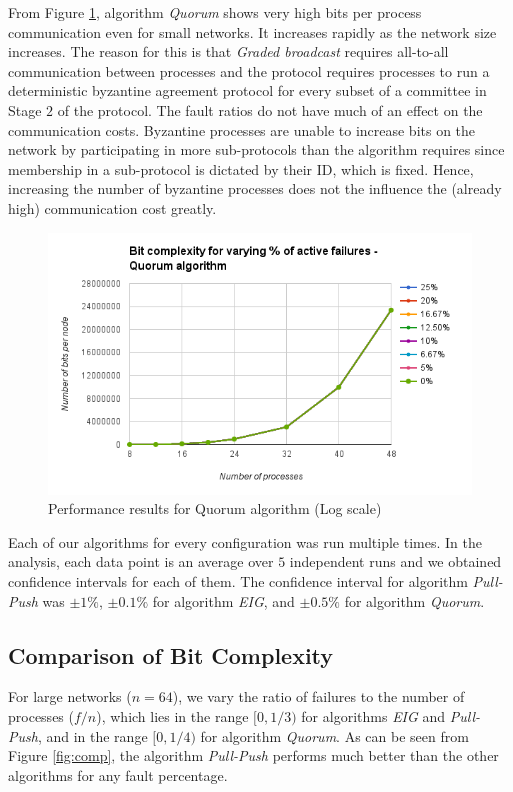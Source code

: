 From Figure \ref{fig:quorum}, algorithm \textit{Quorum} shows very high bits
per process communication even for small networks. It increases rapidly as the
network size increases. The reason for this is that \textit{Graded broadcast}
requires all-to-all communication between processes and the protocol requires
processes to run a deterministic byzantine agreement protocol for every subset
of a committee in Stage $2$ of the protocol. The fault ratios do not have much
of an effect on the communication costs. Byzantine processes are unable to
increase bits on the network by participating in more sub-protocols than the
algorithm requires since membership in a sub-protocol is dictated by their ID,
which is fixed. Hence, increasing the number of byzantine processes does not
the influence the (already high) communication cost greatly.
\begin{figure}[ht] \centering 
    \vspace{-2mm}
    \includegraphics[scale=0.4]{quorum}
     \caption{Performance results for Quorum algorithm (Log
    scale)} \label{fig:quorum}  
    \vspace{-4mm}
\end{figure}

Each of our algorithms for every configuration was run multiple times. In the
analysis, each data point is an average over $5$ independent runs and we
obtained confidence intervals for each of them. The confidence interval for
algorithm \textit{Pull-Push} was $\pm 1\%$, $\pm 0.1\%$ for algorithm \textit{EIG},
and $\pm 0.5\%$ for algorithm \textit{Quorum}.

\subsection{Comparison of Bit Complexity} For large networks ($n = 64$), we
vary the ratio of failures to the number of processes ($f/n$), which lies in
the range $[0, 1/3)$ for algorithms \textit{EIG} and \textit{Pull-Push}, and in
the range $[0, 1/4)$ for algorithm \textit{Quorum}.  As can be seen from
Figure \ref{fig:comp}, the algorithm \textit{Pull-Push} performs much
better than the other algorithms for any fault percentage.

